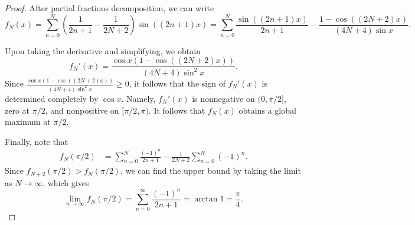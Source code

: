 \documentclass[11pt]{scrartcl}
\newcommand{\<}{\langle}
\renewcommand{\>}{\rangle}
\begin{document}
\begin{proof}
After partial fractions decomposition, we can write 
$$f_N(x) = \sum_{n=0}^N \left (\frac{1}{2n+1} - \frac{1}{2N + 2} \right) \sin((2n + 1)x) = \sum_{n=0}^N \frac{\sin((2n + 1)x)}{2n + 1} - \frac{1 - \cos((2N + 2)x)}{(4N + 4)\sin x}.$$

Upon taking the derivative and simplifying, we obtain
$$f_N'(x) = \frac{\cos x (1 - \cos((2N + 2) x))}{(4N + 4) \sin^2 x}.$$
Since $\frac{\cos x (1 - \cos((2N + 2) x))}{(4N + 4) \sin^2 x} \ge 0$, it follows that the sign of $f_N'(x)$ is determined completely by $\cos x$.  Namely, $f_N'(x)$ is nonnegative on $(0, \pi/2]$, zero at $\pi/2$, and nonpositive on $[\pi/2, \pi)$.  It follows that $f_N(x)$ obtains a global maximum at $\pi/2$.  

Finally, note that 
\begin{align*}
f_N(\pi/2) &= \sum_{n=0}^N \frac{(-1)^n}{2n + 1} -  \frac{1}{2N+2}\sum_{n=0}^N(-1)^n.
\end{align*}
Since $f_{N+2}(\pi/2) > f_N(\pi/2)$, we can find the upper bound by taking the limit as $N \to \infty$, which gives 
$$\lim_{n \to \infty} f_N(\pi/2) = \sum_{n=0}^\infty \frac{(-1)^n}{2n+1} = \arctan{1} = \frac{\pi}{4}.$$
\end{proof}
\end{document}
